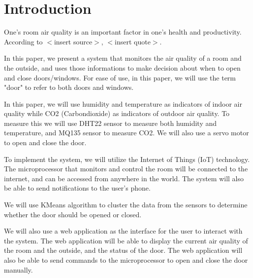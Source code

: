 \section{Introduction}
One's room air quality is an important factor in one's health and productivity.
According to $<$insert source$>$, $<$insert quote$>$.

In this paper, we present a system that monitors the air quality of a room and the outside, and uses those informations to make decision about when to open and close doors/windows.
For ease of use, in this paper, we will use the term "door" to refer to both doors and windows.

In this paper, we will use humidity and temperature as indicators of indoor air quality while CO2 (Carbondioxide) as indicators of outdoor air quality. To measure this we will use DHT22 sensor to measure both humidity and temperature, and MQ135 sensor to measure CO2. We will also use a servo motor to open and close the door.

To implement the system, we will utilize the Internet of Things (IoT) technology. The microprocessor that monitors and control the room will be connected to the internet, and can be accessed from anywhere in the world. The system will also be able to send notifications to the user's phone.

We will use KMeans algorithm to cluster the data from the sensors to determine whether the door should be opened or closed.

We will also use a web application as the interface for the user to interact with the system.
The web application will be able to display the current air quality of the room and the outside, and the status of the door. The web application will also be able to send commands to the microprocessor to open and close the door manually.